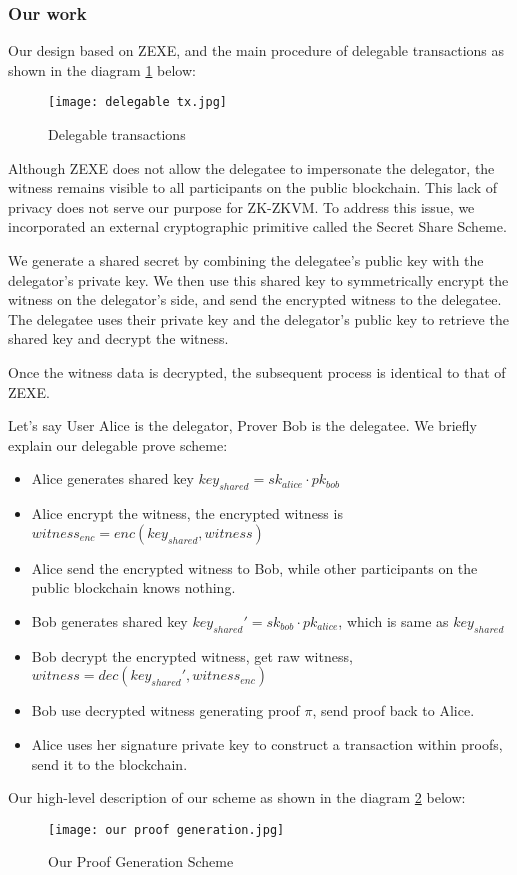 \subsubsection{Our work}

Our design based on ZEXE, and the main procedure of delegable transactions as shown in the diagram \ref{fig:delegable_tx} below:

\begin{figure}[!ht]
    \centering
    \texttt{[image: delegable tx.jpg]}
    \caption{Delegable transactions}
    \label{fig:delegable_tx}
\end{figure}

Although ZEXE does not allow the delegatee to impersonate the delegator, the witness remains visible to all participants on the public blockchain. This lack of privacy does not serve our purpose for ZK-ZKVM. To address this issue, we incorporated an external cryptographic primitive called the Secret Share Scheme.

We generate a shared secret by combining the delegatee's public key with the delegator's private key. We then use this shared key to symmetrically encrypt the witness on the delegator's side, and send the encrypted witness to the delegatee. The delegatee uses their private key and the delegator's public key to retrieve the shared key and decrypt the witness.

Once the witness data is decrypted, the subsequent process is identical to that of ZEXE.

Let's say User Alice is the delegator, Prover Bob is the delegatee. We briefly explain our delegable prove scheme:

\begin{itemize}
    \item Alice generates shared key $key_{shared} = sk_{alice} \cdot pk_{bob}$
    \item Alice encrypt the witness, the encrypted witness is $witness_{enc} = enc(key_{shared}, witness)$
    \item Alice send the encrypted witness to Bob, while other participants on the public blockchain knows nothing.
    \item Bob generates shared key $key_{shared}' = sk_{bob} \cdot pk_{alice}$, which is same as $key_{shared}$
    \item Bob decrypt the encrypted witness, get raw witness, $witness = dec(key_{shared}', witness_{enc})$
    \item Bob use decrypted witness generating proof $\pi$, send proof back to Alice.
    \item Alice uses her signature private key to construct a transaction within proofs, send it to the blockchain.
\end{itemize}

Our high-level description of our scheme as shown in the diagram \ref{fig:our_proof_generation} below:
\begin{figure}[!ht]
    \centering
    \texttt{[image: our proof generation.jpg]}
    \caption{Our Proof Generation Scheme}
    \label{fig:our_proof_generation}
\end{figure} 